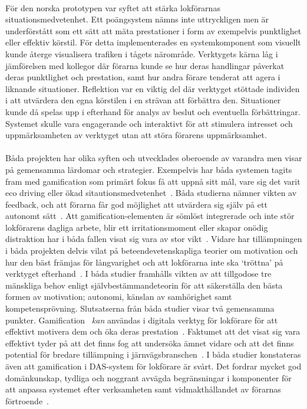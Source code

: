 \paragraph{}
\hspace{-11}För den norska prototypen var syftet att stärka lokförarnas situationsmedvetenhet.
Ett poängsystem nämns inte uttryckligen men är underförstått som ett sätt att mäta prestationer i form av exempelvis punktlighet eller effektiv körstil.
För detta implementerades en systemkomponent som visuellt kunde återge visualisera trafiken i tågets närområde.
Verktygets kärna låg i jämförelsen med kollegor där förarna kunde se hur deras handlingar påverkat deras punktlighet och prestation, samt hur andra förare tenderat att agera i liknande situationer.
Reflektion var en viktig del där verktyget stöttade individen i att utvärdera den egna körstilen i en strävan att förbättra den.
Situationer kunde då spelas upp i efterhand för analys av beslut och eventuella förbättringar.
Systemet skulle vara engagerande och interaktivt för att stimulera intresset och uppmärksamheten av verktyget utan att störa förarens uppmärksamhet.
\paragraph{}
\hspace{-11}Båda projekten har olika syften och utvecklades oberoende av varandra men visar på gemensamma lärdomar och strategier.
Exempelvis har båda systemen tagits fram med gamification som primärt fokus få att uppnå sitt mål, vare sig det varit eco driving eller ökad sitautionsmedvetenhet~\cite{Bae2014, Cwil2018}.
Båda studierna nämner vikten av feedback, och att förarna får god möjlighet att utvärdera sig själv på ett autonomt sätt~\cite{Bae2014, Cwil2018}.
Att gamification-elementen är sömlöst integrerade och inte stör lokförarens dagliga arbete, blir ett irritationsmoment eller skapar onödig distraktion har i båda fallen visat sig vara av stor vikt~\cite{Bae2014, Cwil2018}.
Vidare har tillämpningen i båda projekten delvis vilat på beteendevetenskapliga teorier om motivation och hur den bäst främjas för långvarighet och att lokförarna inte ska \lq{}tröttna\rq{} på verktyget efterhand~\cite{Bae2014, Cwil2018}.
I båda studier framhålls vikten av att tillgodose tre mänskliga behov enligt självbestämmandeteorin för att säkerställa den bästa formen av motivation; autonomi, känslan av samhörighet samt kompetensprövning.
Slutsatserna från båda studier visar två gemensamma punkter.
Gamification ~\emph{kan} användas i digitala verktyg för lokförare för att effektivt motivera dem och öka deras prestation~\cite{Bae2014, Cwil2018}.
Faktumet att det visat sig vara effektivt tyder på att det finns fog att undersöka ämnet vidare och att det finns potential för bredare tillämpning i järnvägsbranschen~\cite{Bae2014, Cwil2018}.
I båda studier konstateras även att gamification i DAS-system för lokförare är svårt.
Det fordrar mycket god domänkunskap, tydliga och noggrant avvägda begränsningar i komponenter för att anpassa systemet efter verksamheten samt vidmakthållandet av förarnas förtroende~\cite{Bae2014, Cwil2018}.
